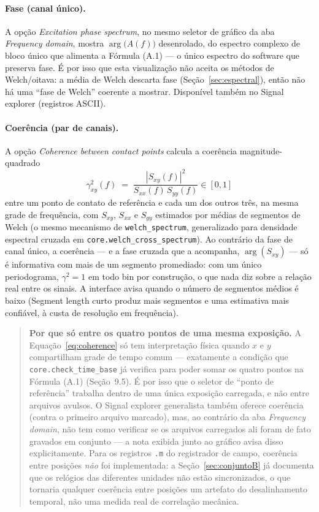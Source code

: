 \documentclass[11pt,a4paper]{article}
\newcommand{\code}[1]{\texttt{\small #1}}
\begin{document}
\paragraph{Fase (canal único).} A opção \emph{Excitation phase spectrum}, no
mesmo seletor de gráfico da aba \emph{Frequency domain}, mostra
$\arg\big(A(f)\big)$ desenrolado, do espectro complexo de bloco único que
alimenta a Fórmula (A.1) --- o único espectro do software que preserva fase.
É por isso que esta visualização não aceita os métodos de Welch/oitava: a
média de Welch descarta fase (Seção~\ref{sec:espectral}), então não há uma
``fase de Welch'' coerente a mostrar. Disponível também no Signal explorer
(registros ASCII).

\paragraph{Coerência (par de canais).} A opção \emph{Coherence between
contact points} calcula a coerência magnitude-quadrado
\begin{equation}
\gamma^2_{xy}(f) \;=\; \frac{|S_{xy}(f)|^2}{S_{xx}(f)\,S_{yy}(f)} \in [0, 1]
\label{eq:coherence}
\end{equation}
entre um ponto de contato de referência e cada um dos outros três, na mesma
grade de frequência, com $S_{xy}$, $S_{xx}$ e $S_{yy}$ estimados por médias de
segmentos de Welch (o mesmo mecanismo de \code{welch\_spectrum}, generalizado
para densidade espectral cruzada em \code{core.welch\_cross\_spectrum}). Ao
contrário da fase de canal único, a coerência --- e a fase cruzada que a
acompanha, $\arg(S_{xy})$ --- só é informativa com mais de um segmento
promediado: com um único periodograma, $\gamma^2 = 1$ em todo bin por
construção, o que nada diz sobre a relação real entre os sinais. A interface
avisa quando o número de segmentos médios é baixo (Segment length curto
produz mais segmentos e uma estimativa mais confiável, à custa de resolução em
frequência).

\begin{quote}
\textbf{Por que só entre os quatro pontos de uma mesma exposição.} A
Equação~\eqref{eq:coherence} só tem interpretação física quando $x$ e $y$
compartilham grade de tempo comum --- exatamente a condição que
\code{core.check\_time\_base} já verifica para poder somar os quatro pontos na
Fórmula (A.1) (Seção~9.5). É por isso que o seletor de ``ponto de referência''
trabalha dentro de uma única exposição carregada, e não entre arquivos
avulsos. O Signal explorer generalista também oferece coerência (contra o
primeiro arquivo marcado), mas, ao contrário da aba \emph{Frequency domain},
não tem como verificar se os arquivos carregados ali foram de fato gravados em
conjunto --- a nota exibida junto ao gráfico avisa disso explicitamente. Para
os registros \code{.m} do registrador de campo, coerência entre posições
\emph{não} foi implementada: a Seção~\ref{sec:conjuntoB} já documenta que os
relógios das diferentes unidades não estão sincronizados, o que tornaria
qualquer coerência entre posições um artefato do desalinhamento temporal, não
uma medida real de correlação mecânica.
\end{quote}
\end{document}
